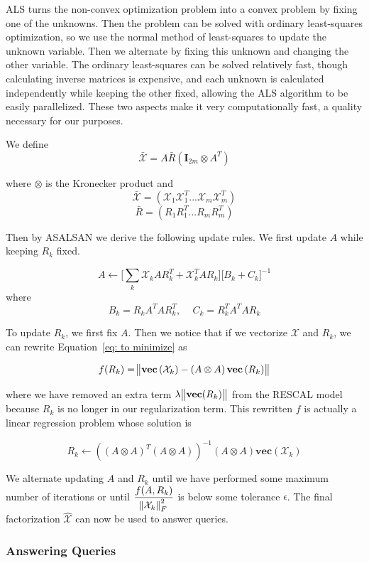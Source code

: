 \documentclass[pageno]{final_paper}
\begin{document}
ALS turns the non-convex optimization problem into a convex problem by fixing
one of the unknowns. Then the problem can be solved with ordinary least-squares
optimization, so we use the normal method of least-squares to update the unknown
variable. Then we alternate by fixing this unknown and changing the other
variable. The ordinary least-squares can be solved relatively fast, though
calculating inverse matrices is expensive, and each unknown is calculated
independently while keeping the other fixed, allowing the ALS algorithm to be
easily parallelized. These two aspects make it very computationally fast, a
quality necessary for our purposes.

We define
$$\bar{\mathcal{X}} = A\bar{R}(\mathbf{I}_{2m} \otimes A^T)$$

where $\otimes$ is the Kronecker product and
$$\bar{\mathcal{X}} = \left( \mathcal{X}_1\mathcal{X}_1^T ... \mathcal{X}_m\mathcal{X}_m^T \right)$$
$$\bar{R} = \left( R_1 R_1^T ... R_mR_m^T \right)$$

Then by ASALSAN we derive the following update rules. We first update $A$ while
keeping $R_k$ fixed.

$$A \leftarrow \bigg[ \sum_k \mathcal{X}_kAR_k^T + \mathcal{X}_k^TAR_k \bigg] \bigg[ B_k + C_k \bigg]^{-1}$$
where
$$B_k = R_k A^T AR_k^T,\,\,\,\,\,\,\, C_k = R_k^TA^TAR_k$$

To update $R_k$, we first fix $A$. Then we notice that if we vectorize
$\mathcal{X}$ and $R_k$, we can rewrite Equation~\eqref{eq: to minimize} as

$$f(R_k) = \norm{\textbf{vec}\left(\mathcal{X}_k\right) - \left(A \otimes A \right)
\textbf{vec}\left(R_k\right)}$$

where we have removed an extra term $\lambda \norm{\textbf{vec}(R_k)}$ from the
RESCAL model because $R_k$ is no longer in our regularization term. This
rewritten $f$ is actually a linear regression problem whose solution is

$$R_k \leftarrow \left( \left(A \otimes A \right)^T \left(A \otimes A\right)
 \right) ^{-1} \left(A \otimes A\right) \textbf{vec}\left(\mathcal{X}_k\right)$$

We alternate updating $A$ and $R_k$ until we have performed some maximum number
of iterations or until $\dfrac{f(A, R_k)}{\norm{\mathcal{X}_k}_F^2}$ is below
some tolerance $\epsilon$. The final factorization $\hat{\mathcal{X}}$ can now
be used to answer queries.

\subsubsection{Answering Queries}
\label{Answering Queries}
\end{document}

